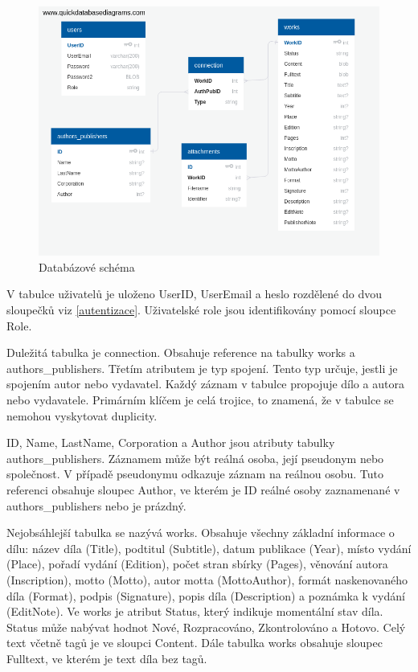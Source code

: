         \begin {figure}[H]\centering
            \includegraphics[width=\textwidth]{images/schema}
            \caption {Databázové schéma}
            \label {fig:schema}
        \end{figure}
        
        V tabulce uživatelů je uloženo UserID, UserEmail a heslo rozdělené do dvou sloupečků viz \ref{autentizace}. Uživatelské role jsou identifikovány pomocí sloupce Role.
        
        Duležitá tabulka je connection. Obsahuje reference na tabulky works a authors\_publishers. Třetím atributem je typ spojení. Tento typ určuje, jestli je spojením autor nebo vydavatel. Každý záznam v tabulce propojuje dílo a autora nebo vydavatele. Primárním klíčem je celá trojice, to znamená, že v tabulce se nemohou vyskytovat duplicity.
        
        ID, Name, LastName, Corporation a Author jsou atributy tabulky authors\_publishers. Záznamem může být reálná osoba, její pseudonym nebo společnost. V případě pseudonymu odkazuje záznam na reálnou osobu. Tuto referenci obsahuje sloupec Author, ve kterém je ID reálné osoby zaznamenané v authors\_publishers nebo je prázdný.
        
        Nejobsáhlejší tabulka se nazývá works. Obsahuje všechny základní informace o dílu: název díla (Title), podtitul (Subtitle), datum publikace (Year), místo vydání (Place), pořadí vydání (Edition), počet stran sbírky (Pages), věnování autora (Inscription), motto (Motto), autor motta (MottoAuthor), formát naskenovaného díla (Format), podpis (Signature), popis díla (Description) a poznámka k vydání (EditNote). Ve works je atribut Status, který indikuje momentální stav díla. Status může nabývat hodnot Nové, Rozpracováno, Zkontrolováno a Hotovo. Celý text včetně tagů je ve sloupci Content. Dále tabulka works obsahuje sloupec Fulltext, ve kterém je text díla bez tagů.
        
